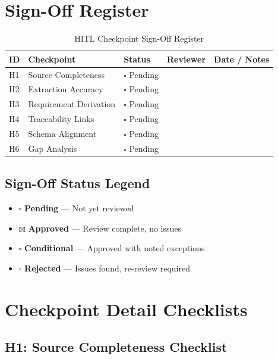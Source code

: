 \section{Sign-Off Register}
\label{sec:signoff-register}

\begin{table}[h]
\centering
\caption{HITL Checkpoint Sign-Off Register}
\label{tab:signoff-register}
\begin{tabularx}{\textwidth}{@{}C{1cm}L{3.5cm}C{2cm}C{2.5cm}L{3.5cm}@{}}
\toprule
\textbf{ID} & \textbf{Checkpoint} & \textbf{Status} & \textbf{Reviewer} & \textbf{Date / Notes} \\
\midrule
H1 & Source Completeness & $\square$ Pending & & \\
H2 & Extraction Accuracy & $\square$ Pending & & \\
H3 & Requirement Derivation & $\square$ Pending & & \\
H4 & Traceability Links & $\square$ Pending & & \\
H5 & Schema Alignment & $\square$ Pending & & \\
H6 & Gap Analysis & $\square$ Pending & & \\
\bottomrule
\end{tabularx}
\end{table}

\subsection{Sign-Off Status Legend}

\begin{itemize}[noitemsep]
  \item $\square$ \textbf{Pending} --- Not yet reviewed
  \item $\boxtimes$ \textbf{Approved} --- Review complete, no issues
  \item $\square$ \textbf{Conditional} --- Approved with noted exceptions
  \item $\square$ \textbf{Rejected} --- Issues found, re-review required
\end{itemize}

\section{Checkpoint Detail Checklists}
\label{sec:checkpoint-checklists}

\subsection{H1: Source Completeness Checklist}

